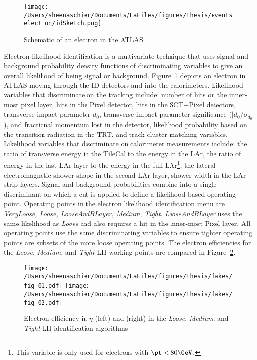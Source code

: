     \begin{figure}[tbp]
       \texttt{[image: /Users/sheenaschier/Documents/LaFiles/figures/thesis/eventselection/idSketch.png]}\\
   \caption{Schematic of an electron in the ATLAS}
   \label{fig:idsketch}
 \end{figure}
Electron likelihood identification is a multivariate technique that uses signal and background probability density functions of discriminating variables to give an overall likelihood of being signal or background.  Figure~\ref{fig:idsketch} depicts an electron in ATLAS moving through the ID detectors and into the calorimeters.  Likelihood variables that discriminate on the tracking include: number of hits on the inner-most pixel layer, hits in the Pixel detector, hits in the SCT+Pixel detectors, transverse impact parameter $d_0$, transverse impact parameter significance ($|d_0/\sigma_{d_0}$), and fractional momentum lost in the detector, likelihood probability based on the transition radiation in the TRT, and track-cluster matching variables.  Likelihood variables that discriminate on calorimeter measurements include: the ratio of transverse energy in the TileCal to the energy in the LAr, the ratio of energy in the last LAr layer to the energy in the full LAr\footnote{This variable is only used for electrons with $\pt<80\GeV$.}, the lateral electromagnetic shower shape in the second LAr layer, shower width in the LAr strip layers.  Signal and background probabilities combine into a single discriminant on which a cut is applied to define a likelihood-based operating point.  Operating points in the electron likelihood identification menu are \textit{VeryLoose, Loose, LooseAndBLayer, Medium}, \textit{Tight}.  \textit{LooseAndBLayer} uses the same likelihood as \textit{Loose} and also requires a hit in the inner-most Pixel layer.  All operating points use the same discriminating variables to ensure tighter operating points are subsets of the more loose operating points.  The electron efficiencies for the \textit{Loose}, \textit{Medium}, and \textit{Tight} LH working points are compared in Figure~\ref{fig:lepEff}.
\begin{figure}[h!]
 \centering
 \texttt{[image: /Users/sheenaschier/Documents/LaFiles/figures/thesis/fakes/fig\_01.pdf]}
  \texttt{[image: /Users/sheenaschier/Documents/LaFiles/figures/thesis/fakes/fig\_02.pdf]}
 \caption{Electron efficiency in $\eta$ (left) and \et (right) in the \textit{Loose}, \textit{Medium}, and \textit{Tight} LH identification algorithms}
 \label{fig:lepEff}
 \end{figure}
 
